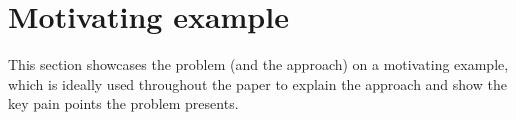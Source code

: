 \section{Motivating example}
\label{sec:motivating-example}

This section showcases the problem (and the approach) on a motivating example, which is ideally
used throughout the paper to explain the approach and show the key pain points the problem
presents.
